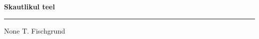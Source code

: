 \documentclass[10pt]{book}
\begin{document}
{
  \samepage
  \raggedbottom
  \raggedright
  \sloppy


  \vspace{0.2in}

  \noindent\begin{minipage}{.1\textwidth}
    \hfill\vspace{0.1in}
  \end{minipage}%
  \noindent\begin{minipage}{.8\textwidth}
    \centering
    \bfseries
    \large Skautlikul teel
  \end{minipage}%
  \noindent\begin{minipage}{.1\textwidth}
      \hfill\vspace{0.1in}
  \end{minipage}

  \nopagebreak[4]
  \vspace{0.1in}
  \nopagebreak[4]
  \hrule height 0.05ex
  \nopagebreak[4]
  \vspace{-0.05in}

  {\footnotesize None \hfill T. Fischgrund }\\
  \vspace{0.01in}



}
\end{document}
